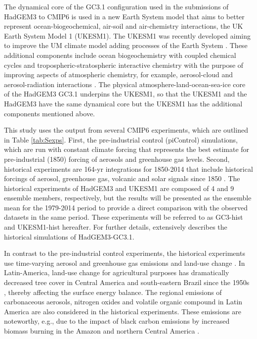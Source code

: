 The dynamical core of the GC3.1 configuration used in the submissions of HadGEM3 to CMIP6 is used in a new Earth System model that aims to better represent ocean-biogeochemical, air-soil and air-chemistry interactions, the UK Earth System Model 1 (UKESM1). 
The UKESM1 was recently developed aiming to improve the UM climate model adding processes of the Earth System \citep{sellar2019}. These additional components include ocean biogeochemistry with coupled chemical cycles and tropospheric-stratospheric interactive chemistry with the purpose of improving aspects of atmospheric chemistry, for example, aerosol-cloud and aerosol-radiation interactions \citep{mulcahy2018,sellar2019}.
The physical atmosphere-land-ocean-sea-ice core of the HadGEM3 GC3.1 underpins the UKESM1, so that the UKESM1 and the HadGEM3 have the same dynamical core but the UKESM1 has the additional components mentioned above.



This study uses the output from several CMIP6 experiments, which are outlined in Table \ref{tab:Sexps}. First, the pre-industrial control (piControl) simulations, which are run with constant climate forcing that represents the best estimate for pre-industrial (1850) forcing of aerosols and greenhouse gas levels. Second, historical experiments are 164-yr integrations for 1850-2014 that include historical forcings of aerosol, greenhouse gas, volcanic and solar signals since 1850 \citep{eyring2016,andrews2019}. 
The historical experiments of HadGEM3 and UKESM1 are composed of 4 and 9 ensemble members, respectively, but the results will be presented as the ensemble mean for the 1979-2014 period to provide a direct comparison with the observed datasets in the same period.
These experiments will be referred to as GC3-hist and UKESM1-hist hereafter.
For further details, \cite{andrews2020} extensively describes the historical simulations of HadGEM3-GC3.1. %

In contrast to the pre-industrial control experiments, the historical experiments use  time-varying aerosol and greenhouse gas emissions and land-use change \citep{eyring2016}. In Latin-America, land-use change for agricultural purposes has dramatically decreased tree cover in Central America and south-eastern Brazil since the 1950s \citep{lawrence2012}, thereby affecting the surface energy balance. %
The regional emissions of carbonaceous aerosols, nitrogen oxides and volatile organic compound in Latin America are also considered in the historical experiments. These emissions are noteworthy, e.g., due to the impact of black carbon emissions by increased biomass burning in the Amazon and northern Central America \citep{chuvieco2008}.  



